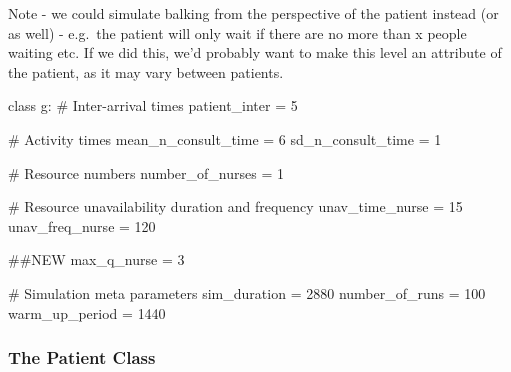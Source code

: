 \documentclass[
  letterpaper,
  DIV=11,
  numbers=noendperiod]{scrreprt}
\newenvironment{Shaded}{}{}
\newcommand{\CommentTok}[1]{\textcolor[rgb]{0.42,0.45,0.49}{#1}}
\newcommand{\DecValTok}[1]{\textcolor[rgb]{0.00,0.36,0.77}{#1}}
\newcommand{\KeywordTok}[1]{\textcolor[rgb]{0.84,0.23,0.29}{#1}}
\newcommand{\NormalTok}[1]{\textcolor[rgb]{0.14,0.16,0.18}{#1}}
\newcommand{\OperatorTok}[1]{\textcolor[rgb]{0.14,0.16,0.18}{#1}}
\begin{document}
\begin{tcolorbox}[enhanced jigsaw, colframe=quarto-callout-note-color-frame, bottomtitle=1mm, breakable, rightrule=.15mm, coltitle=black, colbacktitle=quarto-callout-note-color!10!white, opacityback=0, leftrule=.75mm, arc=.35mm, toptitle=1mm, title=\textcolor{quarto-callout-note-color}{\faInfo}\hspace{0.5em}{Note}, titlerule=0mm, colback=white, toprule=.15mm, bottomrule=.15mm, left=2mm, opacitybacktitle=0.6]

Note - we could simulate balking from the perspective of the patient
instead (or as well) - e.g.~the patient will only wait if there are no
more than x people waiting etc. If we did this, we'd probably want to
make this level an attribute of the patient, as it may vary between
patients.

\end{tcolorbox}

\begin{Shaded}
\begin{Highlighting}[]
\KeywordTok{class}\NormalTok{ g:}
    \CommentTok{\# Inter{-}arrival times}
\NormalTok{    patient\_inter }\OperatorTok{=} \DecValTok{5}

    \CommentTok{\# Activity times}
\NormalTok{    mean\_n\_consult\_time }\OperatorTok{=} \DecValTok{6}
\NormalTok{    sd\_n\_consult\_time }\OperatorTok{=} \DecValTok{1}

    \CommentTok{\# Resource numbers}
\NormalTok{    number\_of\_nurses }\OperatorTok{=} \DecValTok{1}

    \CommentTok{\# Resource unavailability duration and frequency}
\NormalTok{    unav\_time\_nurse }\OperatorTok{=} \DecValTok{15}
\NormalTok{    unav\_freq\_nurse }\OperatorTok{=} \DecValTok{120}

    \CommentTok{\#\#NEW}
\NormalTok{    max\_q\_nurse }\OperatorTok{=} \DecValTok{3}

    \CommentTok{\# Simulation meta parameters}
\NormalTok{    sim\_duration }\OperatorTok{=} \DecValTok{2880}
\NormalTok{    number\_of\_runs }\OperatorTok{=} \DecValTok{100}
\NormalTok{    warm\_up\_period }\OperatorTok{=} \DecValTok{1440}
\end{Highlighting}
\end{Shaded}

\subsubsection{The Patient Class}\label{the-patient-class-6}
\end{document}
